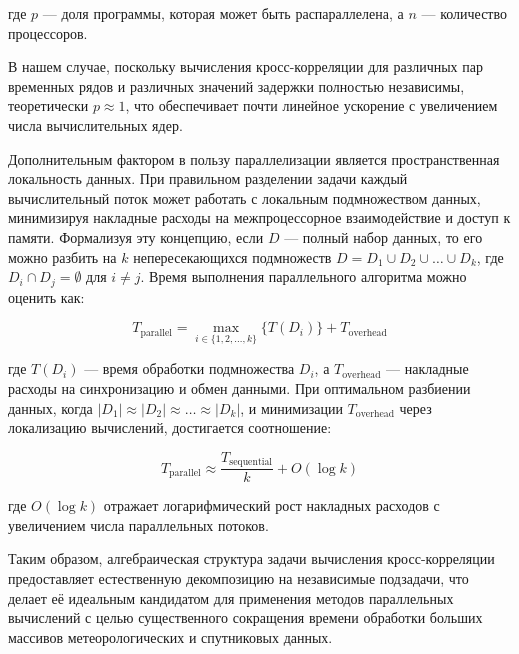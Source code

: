 где $p$ — доля программы, которая может быть распараллелена, а $n$ — количество процессоров.

В нашем случае, поскольку вычисления кросс-корреляции для различных пар временных рядов и различных значений задержки полностью независимы, теоретически $p \approx 1$, что обеспечивает почти линейное ускорение с увеличением числа вычислительных ядер.

Дополнительным фактором в пользу параллелизации является пространственная локальность данных. При правильном разделении задачи каждый вычислительный поток может работать с локальным подмножеством данных, минимизируя накладные расходы на межпроцессорное взаимодействие и доступ к памяти. Формализуя эту концепцию, если $D$ — полный набор данных, то его можно разбить на $k$ непересекающихся подмножеств $D = D_1 \cup D_2 \cup \ldots \cup D_k$, где $D_i \cap D_j = \emptyset$ для $i \neq j$. Время выполнения параллельного алгоритма можно оценить как:

\[
T_{\text{parallel}} = \max_{i \in \{1, 2, \ldots, k\}} \{T(D_i)\} + T_{\text{overhead}}
\]

где $T(D_i)$ — время обработки подмножества $D_i$, а $T_{\text{overhead}}$ — накладные расходы на синхронизацию и обмен данными. При оптимальном разбиении данных, когда $|D_1| \approx |D_2| \approx \ldots \approx |D_k|$, и минимизации $T_{\text{overhead}}$ через локализацию вычислений, достигается соотношение:

\[
T_{\text{parallel}} \approx \frac{T_{\text{sequential}}}{k} + O(\log k)
\]

где $O(\log k)$ отражает логарифмический рост накладных расходов с увеличением числа параллельных потоков.


Таким образом, алгебраическая структура задачи вычисления кросс-корреляции предоставляет естественную декомпозицию на независимые подзадачи, что делает её идеальным кандидатом для применения методов параллельных вычислений с целью существенного сокращения времени обработки больших массивов метеорологических и спутниковых данных.






